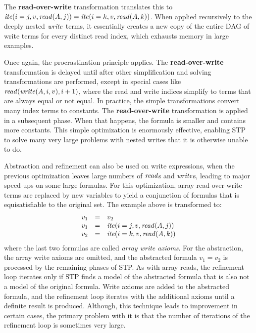 The {\bf read-over-write} transformation translates this to
${\it ite}(i=j,v,{\it read}(A,j)) = {\it ite}(i=k,v,{\it read}(A,k))$.  When
applied recursively to the deeply nested ${\it write}$ terms, it
essentially creates a new copy of the entire DAG of write terms for
every distinct read index, which exhausts memory in large examples.

Once again, the procrastination principle applies.  
The {\bf read-over-write} transformation is delayed until after other
simplification and solving transformations are performed,
except in special cases like ${\it read}({\it write}(A, i, v), i+1)$,
where the read and write indices simplify to terms that are 
always equal or not equal.
In practice, the simple transformations convert many index terms to
constants.  The {\bf read-over-write} transformation is applied
in a subsequent phase.  When that happens, the formula is smaller
and contains more constants.
This simple optimization is enormously effective, enabling STP to
solve many very large problems with nested writes that it is otherwise
unable to do.

Abstraction and refinement can also be used on write expressions, when
the previous optimization leaves large numbers of ${\it read}$s and
${\it write}$s, leading to major speed-ups on some large formulas.
For this optimization, array read-over-write terms are
replaced by new variables to yield a conjunction of formulas that is
equisatisfiable to the original set.  The example above is transformed
to:
\[
\begin{array}{rcl}
v_1 &=& v_2 \\
v_1 &=& {\it ite}(i=j,v,{\it read}(A,j)) \\
v_2 &=& {\it ite}(i=k,v,{\it read}(A,k))
\end{array}
\]
where the last two formulas are called {\it array write axioms}. For
the abstraction, the array write axioms are omitted, and the
abstracted formula $v_1 = v_2$ is processed by the remaining phases of
STP.  As with array reads, the refinement loop iterates only if STP
finds a model of the abstracted formula that is also not a model of
the original formula. Write axioms are added to the abstracted
formula, and the refinement loop iterates with the additional axioms
until a definite result is produced. Although, this technique leads to
improvement in certain cases, the primary problem with it is that the
number of iterations of the refinement loop is sometimes very large.

